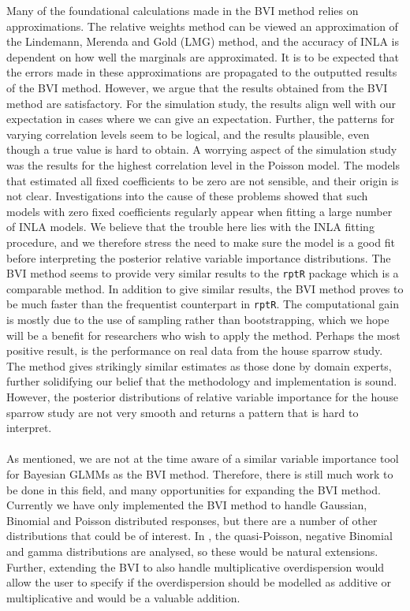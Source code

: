 Many of the foundational calculations made in the BVI method relies on approximations. The relative weights method can be viewed an approximation of the Lindemann, Merenda and Gold (LMG) method, and the accuracy of INLA is dependent on how well the marginals are approximated. It is to be expected that the errors made in these approximations are propagated to the outputted results of the BVI method. However, we argue that the results obtained from the BVI method are satisfactory. For the simulation study, the results align well with our expectation in cases where we can give an expectation. Further, the patterns for varying correlation levels seem to be logical, and the results plausible, even though a true value is hard to obtain. A worrying aspect of the simulation study was the results for the highest correlation level in the Poisson model. The models that estimated all fixed coefficients to be zero are not sensible, and their origin is not clear. Investigations into the cause of these problems showed that such models with zero fixed coefficients regularly appear when fitting a large number of INLA models. We believe that the trouble here lies with the INLA fitting procedure, and we therefore stress the need to make sure the model is a good fit before interpreting the posterior relative variable importance distributions. The BVI method seems to provide very similar results to the \texttt{rptR} package which is a comparable method. In addition to give similar results, the BVI method proves to be much faster than the frequentist counterpart in \texttt{rptR}. The computational gain is mostly due to the use of sampling rather than bootstrapping, which we hope will be a benefit for researchers who wish to apply the method. Perhaps the most positive result, is the performance on real data from the house sparrow study. The method gives strikingly similar estimates as those done by domain experts, further solidifying our belief that the methodology and implementation is sound. However, the posterior distributions of relative variable importance for the house sparrow study are not very smooth and returns a pattern that is hard to interpret. 
\\
\\
As mentioned, we are not at the time aware of a similar variable importance tool for Bayesian GLMMs as the BVI method. Therefore, there is still much work to be done in this field, and many opportunities for expanding the BVI method. Currently we have only implemented the BVI method to handle Gaussian, Binomial and Poisson distributed responses, but there are a number of other distributions that could be of interest. In \citet{nakagawa2017}, the quasi-Poisson, negative Binomial and gamma distributions are analysed, so these would be natural extensions. Further, extending the BVI to also handle multiplicative overdispersion would allow the user to specify if the overdispersion should be modelled as additive or multiplicative and would be a valuable addition. 
